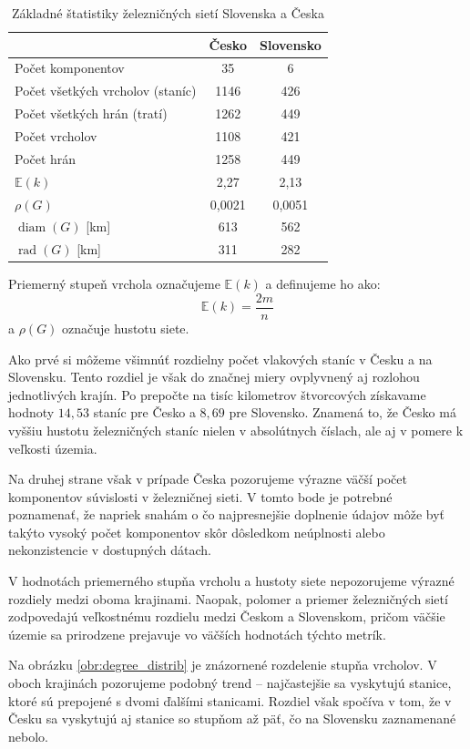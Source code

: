 \documentclass[main.tex]{subfiles}
\begin{document}
\begin{table}[h!]
\centering
\begin{tabular}{@{}lcc@{}}
\toprule
 & Česko & Slovensko \\
\midrule
Počet komponentov & 35 & 6 \\
Počet všetkých vrcholov (staníc) & 1146 & 426 \\
Počet všetkých hrán (tratí) & 1262 & 449 \\
Počet vrcholov & 1108 & 421 \\
Počet hrán & 1258 & 449 \\
$\mathbb{E}(k)$ & 2{,}27 & 2{,}13 \\
$\rho(G)$ & 0{,}0021 & 0{,}0051 \\
$\operatorname{diam}(G)$ [km] & 613 & 562 \\
$\operatorname{rad}(G)$ [km] & 311 & 282 \\
\bottomrule
\end{tabular}
\caption{Základné štatistiky železničných sietí Slovenska a Česka}
\label{tab:statistics}
\end{table}
Priemerný stupeň vrchola označujeme $\mathbb{E}(k)$ a definujeme ho ako:
\begin{equation*}
    \mathbb{E}(k) = \frac{2m}{n}
\end{equation*}
a $\rho(G)$ označuje hustotu siete.

Ako prvé si môžeme všimnúť rozdielny počet vlakových staníc v Česku a na Slovensku. Tento rozdiel je však do značnej miery ovplyvnený aj rozlohou jednotlivých krajín. Po prepočte na tisíc kilometrov štvorcových získavame hodnoty $14{,}53$ staníc pre Česko a $8{,}69$ pre Slovensko. Znamená to, že Česko má vyššiu hustotu železničných staníc nielen v absolútnych číslach, ale aj v pomere k veľkosti územia.

Na druhej strane však v prípade Česka pozorujeme výrazne väčší počet komponentov súvislosti v železničnej sieti. V tomto bode je potrebné poznamenať, že napriek snahám o čo najpresnejšie doplnenie údajov môže byť takýto vysoký počet komponentov skôr dôsledkom neúplnosti alebo nekonzistencie v dostupných dátach.

V hodnotách priemerného stupňa vrcholu a hustoty siete nepozorujeme výrazné rozdiely medzi oboma krajinami. Naopak, polomer a priemer železničných sietí zodpovedajú veľkostnému rozdielu medzi Českom a Slovenskom, pričom väčšie územie sa prirodzene prejavuje vo väčších hodnotách týchto metrík.

Na obrázku \ref{obr:degree_distrib} je znázornené rozdelenie stupňa vrcholov. V oboch krajinách pozorujeme podobný trend – najčastejšie sa vyskytujú stanice, ktoré sú prepojené s dvomi ďalšími stanicami. Rozdiel však spočíva v tom, že v Česku sa vyskytujú aj stanice so stupňom až päť, čo na Slovensku zaznamenané nebolo.
\end{document}
